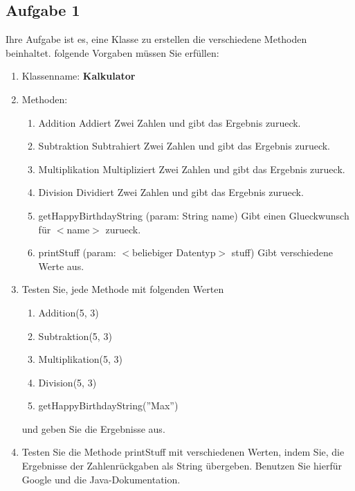 \documentclass[12pt, a4paper]{article}
\begin{document}
\subsection*{Aufgabe 1}
Ihre Aufgabe ist es, eine Klasse zu erstellen die verschiedene Methoden beinhaltet. folgende Vorgaben müssen Sie erfüllen:
\begin{enumerate}[label=$\alph*)$]
    \item Klassenname: \textbf{Kalkulator}
    \item Methoden:
    \begin{enumerate}
        \item Addition
        \subsubitem Addiert Zwei Zahlen und gibt das Ergebnis zurueck.
        \item Subtraktion
        \subsubitem Subtrahiert Zwei Zahlen und gibt das Ergebnis zurueck.
        \item Multiplikation
        \subsubitem Multipliziert Zwei Zahlen und gibt das Ergebnis zurueck.
        \item Division
        \subsubitem Dividiert Zwei Zahlen und gibt das Ergebnis zurueck.
        \item getHappyBirthdayString (param: String name)
        \subsubitem Gibt einen Glueckwunsch für $<$name$>$ zurueck.
        \item printStuff (param: $<$beliebiger Datentyp$>$ stuff)
        \subsubitem Gibt verschiedene Werte aus.
    \end{enumerate} 
    \item Testen Sie, jede Methode mit folgenden Werten
    \begin{enumerate}
        \item Addition(5, 3)
        \item Subtraktion(5, 3)
        \item Multiplikation(5, 3)
        \item Division(5, 3)
        \item getHappyBirthdayString(''Max'')
    \end{enumerate}
    und geben Sie die Ergebnisse aus.
    \item Testen Sie die Methode printStuff mit verschiedenen Werten, indem Sie, die Ergebnisse der Zahlenrückgaben als String übergeben. Benutzen Sie hierfür Google und die Java-Dokumentation.
\end{enumerate}
\newpage
\end{document}
